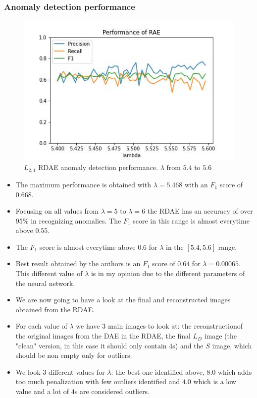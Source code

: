 \documentclass{beamer}
\theoremstyle{plain}
\theoremstyle{definition}
\theoremstyle{remark}
\begin{document}
\begin{frame}
	\frametitle{Anomaly detection performance}
	\begin{figure}
		\centering
		\includegraphics[width=0.8\linewidth]{Images/l21_experiment_from_5.4_to_5.6.jpg}
		\caption[]{$L_{2,1}$ RDAE anomaly detection performance. $\lambda$ from $5.4$ to $5.6$}
	\end{figure}
\end{frame}



\begin{frame}
	\begin{itemize}
		\item The maximum performance is obtained with $\lambda=5.468$ with an $F_1$ score of $0.668$.
		\item Focusing on all values from $\lambda=5$ to $\lambda=6$ the RDAE has an accuracy of over $95\%$ in recognizing anomalies. The $F_1$ score in this range is almost everytime above $0.55$.
		\item The $F_1$ score is almost everytime above $0.6$ for $\lambda$ in the $[5.4, 5.6]$ range.
		\item Best result obtained by the authors is an $F_1$ score of $0.64$ for $\lambda=0.00065$. This different value of $\lambda$ is in my opinion due to the different parameters of the neural network.
	\end{itemize}
\end{frame}


\begin{frame}
	\begin{itemize}
		\item We are now going to have a look at the final and reconstructed images obtained from the RDAE.
		\item For each value of $\lambda$ we have $3$ main images to look at: the reconstructionof the original images from the DAE in the RDAE, the final $L_D$ image (the "clean" version, in this case it should only contain $4$s) and the $S$ image, which should be non empty only for outliers.
		\item We look $3$ different values for $\lambda$: the best one identified above, $8.0$ which adds too much penalization with few outliers identified and $4.0$ which is a low value and a lot of $4$s are considered outliers.
	\end{itemize}
\end{frame}
\end{document}
